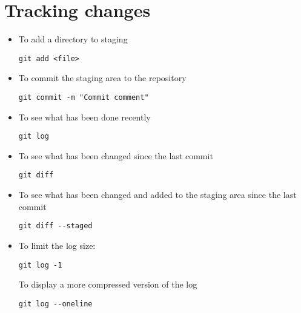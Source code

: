 \documentclass{article}[18pt]
\begin{document}
\section{Tracking changes}
\begin{itemize}
\item To add a directory to staging
\begin{lstlisting}[mathescape=true]
git add <file>
\end{lstlisting}
\item To commit the staging area to the repository
\begin{lstlisting}[mathescape=true]
git commit -m "Commit comment"
\end{lstlisting}
\item To see what has been done recently
\begin{lstlisting}[mathescape=true]
git log
\end{lstlisting}
\item To see what has been changed since the last commit
\begin{lstlisting}[mathescape=true]
git diff
\end{lstlisting}
\item To see what has been changed and added to the staging area since the last commit
\begin{lstlisting}[mathescape=true]
git diff --staged
\end{lstlisting}
\item To limit the log size:
\begin{lstlisting}[mathescape=true]
git log -1
\end{lstlisting}
To display a more compressed version of the log
\begin{lstlisting}[mathescape=true]
git log --oneline
\end{lstlisting}
\end{itemize}
\end{document}
